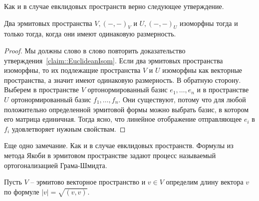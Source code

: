Как и в случае евклидовых пространств верно следующее утверждение.

\begin{claim}
Два эрмитовых пространства $V, ({-},{-})_V$ и $U, ({-},{-})_U$  изоморфны тогда и только тогда, когда они имеют одинаковую размерность.
\end{claim}
\begin{proof}
Мы должны слово в слово повторить доказательство утверждения~\ref{claim::EuclideanIsom}. Если два эрмитовых пространства изоморфны, то их подлежащие пространства $V$ и $U$ изоморфны как векторные пространства, а значит имеют одинаковую размерность. В обратную сторону. Выберем в пространстве $V$ ортонормированный базис $e_1,\ldots,e_n$ и в пространстве $U$ ортонормированный базис $f_1,\ldots, f_n$. Они существуют, потому что для любой положительно определенной эрмитовой формы можно выбрать базис, в котором его матрица единичная. Тогда ясно, что линейное отображение отправляющее $e_i$ в $f_i$ удовлетворяет нужным свойствам.
\end{proof}

Еще одно замечание. Как и в случае евклидовых пространств. Формулы из метода Якоби в эрмитовом пространстве задают процесс называемый ортогонализацией Грама-Шмидта.


\begin{definition}
Пусть $V$ -- эрмитово векторное пространство и $v\in V$ определим длину вектора $v$ по формуле $|v| = \sqrt{(v,v)}$.
\end{definition}

